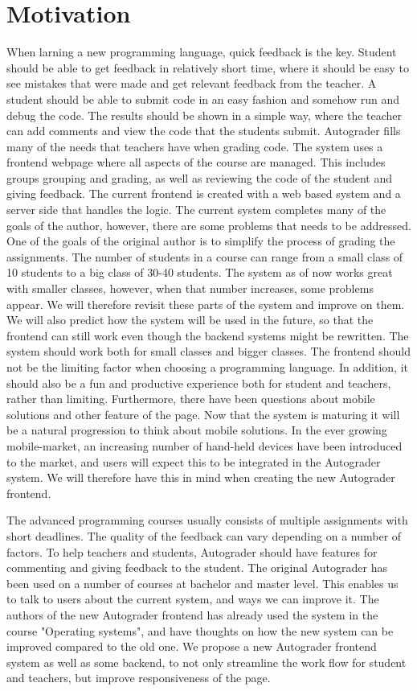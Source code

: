 \documentclass[12pt,a4paper]{report}
\begin{document}
\chapter*{Motivation}

When larning a new programming language, quick feedback is the key. Student should be able to get feedback in relatively short time, where it should be easy to see mistakes that were made and get relevant feedback from the teacher. A student should be able to submit code in an easy fashion and somehow run and debug the code. The results should be shown in a simple way, where the teacher can add comments and view the code that the students submit. Autograder fills many of the needs that teachers have when grading code. The system uses a frontend webpage where all aspects of the course are managed. This includes groups grouping and grading, as well as reviewing the code of the student and giving feedback. The current frontend is created with a web based system and a server side that handles the logic. The current system completes many of the goals of the author, however, there are some problems that needs to be addressed. One of the goals of the original author is to simplify the process of grading the assignments. The number of students in a course can range from a small class of 10 students to a big class of 30-40 students. The system as of now works great with smaller classes, however, when that number increases, some problems appear. We will therefore revisit these parts of the system and improve on them. We will also predict how the system will be used in the future, so that the frontend can still work even though the backend systems might be rewritten. The system should work both for small classes and bigger classes. The frontend should not be the limiting factor when choosing a programming language. In addition, it should also be a fun and productive experience both for student and teachers, rather than limiting. Furthermore, there have been questions about mobile solutions and other feature of the page. Now that the system is maturing it will be a natural progression to think about mobile solutions. In the ever growing mobile-market, an increasing number of hand-held devices have been introduced to the market, and users will expect this to be integrated in the Autograder system. We will therefore have this in mind when creating the new Autograder frontend.

The advanced programming courses usually consists of multiple assignments with short deadlines. The quality of the feedback can vary depending on a number of factors. To help teachers and students, Autograder should have features for commenting and giving feedback to the student. The original Autograder has been used on a number of courses at bachelor and master level. This enables us to talk to users about the current system, and ways we can improve it. The authors of the new Autograder frontend has already used the system in the course "Operating systems", and have thoughts on how the new system can be improved compared to the old one. We propose a new Autograder frontend system as well as some backend, to not only streamline the work flow for student and teachers, but improve responsiveness of the page.
\end{document}

